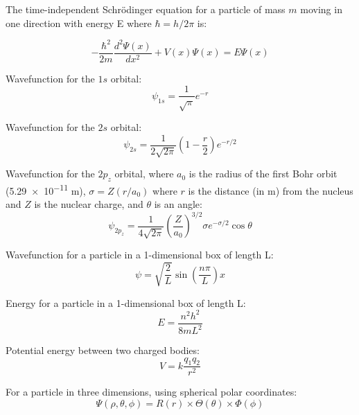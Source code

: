 \documentclass[10pt]{article}
\begin{document}
The time-independent Schr\"odinger equation for a particle of mass $m$ moving in one direction with energy E where $\hbar=h/2\pi$ is:

\begin{equation*}
-\frac{\hbar^2}{2m}\frac{d^2\Psi(x)}{dx^2}+V(x)\Psi(x)=E\Psi(x)
\end{equation*}

Wavefunction for the $1s$ orbital:
\begin{equation*}
\psi_{1s} = \frac{1}{\sqrt{\pi}}e^{-r}
\end{equation*}

Wavefunction for the $2s$ orbital:
\begin{equation*}
\psi_{2s} = \frac{1}{2\sqrt{2\pi}}\left(1-\frac{r}{2}\right)e^{-r/2}
\end{equation*}

Wavefunction for the $2p_z$ orbital, where $a_0$ is the radius of the first Bohr orbit (\num{5.29e-11} m), $\sigma = Z(r/a_0)$ 
where $r$ is the distance (in m) from the nucleus and $Z$ is the nuclear charge, and $\theta$ is an angle:
\begin{equation*}
\psi_{2p_z} = \frac{1}{4\sqrt{2\pi}}\left(\frac{Z}{a_0}\right)^{3/2}\sigma e^{-\sigma/2}\cos\theta
\end{equation*}

Wavefunction for a particle in a 1-dimensional box of length L:
\begin{equation*}
\psi=\sqrt{\frac{2}{L}}\sin\left(\frac{n\pi}{L}\right)x
\end{equation*}

Energy for a particle in a 1-dimensional box of length L:
\begin{equation*}
E = \frac{n^2h^2}{8mL^2}
\end{equation*}

Potential energy between two charged bodies:
\begin{equation*}
V=k\frac{q_1q_2}{r^2}
\end{equation*}

For a particle in three dimensions, using spherical polar coordinates:
\begin{equation*}
\Psi(\rho,\theta,\phi) = R(r) \times \Theta(\theta) \times \Phi(\phi)
\end{equation*}

\end{document}
